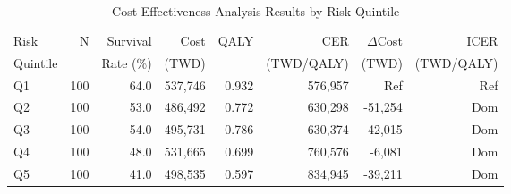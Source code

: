 \begin{table}[htbp]
\centering
\caption{Cost-Effectiveness Analysis Results by Risk Quintile}
\label{tab:cea_results}
\begin{tabular}{lrrrrrrr}
\hline
Risk & N & Survival & Cost & QALY & CER & $\Delta$Cost & ICER \\
Quintile & & Rate (\%) & (TWD) & & (TWD/QALY) & (TWD) & (TWD/QALY) \\
\hline
Q1 & 100 & 64.0 & 537,746 & 0.932 & 576,957 & Ref & Ref \\
Q2 & 100 & 53.0 & 486,492 & 0.772 & 630,298 & -51,254 & Dom \\
Q3 & 100 & 54.0 & 495,731 & 0.786 & 630,374 & -42,015 & Dom \\
Q4 & 100 & 48.0 & 531,665 & 0.699 & 760,576 & -6,081 & Dom \\
Q5 & 100 & 41.0 & 498,535 & 0.597 & 834,945 & -39,211 & Dom \\
\hline
\end{tabular}
\end{table}